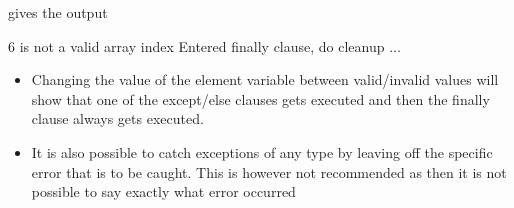 \documentclass[letterpaper,10pt,english,openany]{sphinxmanual}
\begin{document}
\begin{sphinxVerbatim}[commandchars=\\\{\}]
  
  \PYG{p}{[}\PYG{p}{]}
  
      \PYG{p}{[}\PYG{p}{]}
 
      
           
\end{sphinxVerbatim}

gives the output

\begin{sphinxVerbatim}[commandchars=\\\{\}]
6 is not a valid array index
Entered finally clause, do cleanup ...
\end{sphinxVerbatim}
\begin{itemize}
\item {} 
Changing the value of the element variable between valid/invalid
values will show that one of the except/else clauses gets executed
and then the finally clause always gets executed.

\item {} 
It is also possible to catch exceptions of any type by leaving off
the specific error that is to be caught. This is however not
recommended as then it is not possible to say exactly what error
occurred

\end{itemize}

\begin{sphinxVerbatim}[commandchars=\\\{\}]
  
  \PYG{p}{[}\PYG{p}{]}
  
      \PYG{p}{[}\PYG{p}{]}
     
\end{sphinxVerbatim}
\end{document}
